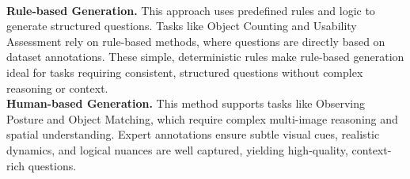 \documentclass[letterpaper]{article} %
\begin{document}
\\ \indent
\textbf{Rule-based Generation.}
This approach uses predefined rules and logic to generate structured questions. Tasks like Object Counting and Usability Assessment rely on rule-based methods, where questions are directly based on dataset annotations. These simple, deterministic rules make rule-based generation ideal for tasks requiring consistent, structured questions without complex reasoning or context.
\\ \indent
\textbf{Human-based Generation.}
This method supports tasks like Observing Posture and Object Matching, which require complex multi-image reasoning and spatial understanding. Expert annotations ensure subtle visual cues, realistic dynamics, and logical nuances are well captured, yielding high-quality, context-rich questions.
\end{document}

